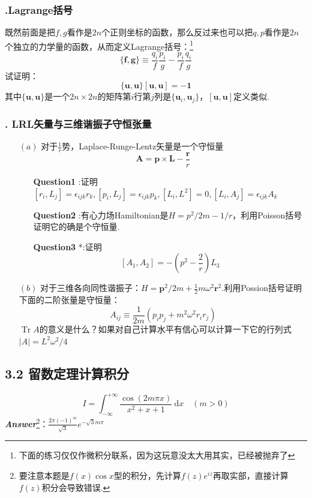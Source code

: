 \documentclass[UTF8,fontset=windows,oneside]{ctexbook}
\begin{document}
\subsubsection{\uppercase\expandafter{}.Lagrange括号}
既然前面是把$f,g$看作是$2n$个正则坐标的函数，那么反过来也可以把$q,p$看作是$2n$个独立的力学量的函数，从而定义Lagrange括号：\footnote{下面的练习仅仅作微积分联系，因为这玩意没太大用其实，已经被抛弃了}
\begin{equation}
	\{\mathbf{f},\mathbf{g}\}\equiv \frac{q_i}{f}\frac{p_i}{g}-\frac{p_i}{f}\frac{q_i}{g}
\end{equation}
试证明：
\begin{equation}
	\{\mathbf{u},\mathbf{u}\}[\mathbf{u},\mathbf{u}]=-\mathbf{1}
\end{equation}
其中$\{\mathbf{u},\mathbf{u}\}$是一个$2n\times 2n$的矩阵第$i$行第$j$列是$\{\mathbf{u}_i,\mathbf{u}_j\}$，$[\mathbf{u},\mathbf{u}]$定义类似.

\subsubsection{\uppercase\expandafter{}. LRL矢量与三维谐振子守恒张量}
\begin{itemize}
	\item[$(a)$] 对于$\frac{1}{r}$势，Laplace-Runge-Lentz矢量是一个守恒量\[\mathbf{A}=\mathbf{p}\times\mathbf{L}-\frac{\mathbf{r}}{r}\]
	\begin{itemize}
		\item[\textbf{Question1}]:证明$[r_i,L_j]=\epsilon_{ijk}r_k,[p_i,L_j]=\epsilon_{ijk}p_k,[L_i,L^2]=0,[L_i,A_j]=\epsilon_{ijk}A_k$
		\item[\textbf{Question2}]:有心力场Hamiltonian是$H=p^2/2m-1/r$，利用Poisson括号证明它的确是个守恒量.
		\item[\textbf{Question3}]*:证明$$[A_1,A_2]=-\left(p^2-\frac{2}{r}\right)L_3$$
	\end{itemize}
	\item[$(b)$]对于三维各向同性谐振子：$H=\mathbf{p}^2/2m+\frac{1}{2}m\omega^2\mathbf{r}^2$.利用Possion括号证明下面的二阶张量是守恒量：
	\begin{equation}
		A_{ij}\equiv \frac{1}{2m}\left(p_ip_j+m^2\omega^2r_ir_j\right)
	\end{equation}
	$\operatorname{Tr}A$的意义是什么？如果对自己计算水平有信心可以计算一下它的行列式$|A|=L^2\omega^2/4$
\end{itemize}
\subsection*{3.2 留数定理计算积分}
\begin{equation}
	I=\int_{-\infty}^{+\infty}\frac{\cos(2m\pi x)}{x^2+x+1}\mathrm{~d}x\quad (m>0)
\end{equation}
{\itshape\textbf{Answer}}\footnote{要注意本题是$f(x)\cos x$型的积分，先计算$f(z)e^{iz}$再取实部，直接计算$f(z)$积分会导致错误.}：$\frac{2\pi(-1)^m}{\sqrt{3}}e^{-\sqrt{3}m\pi}$
\end{document}
